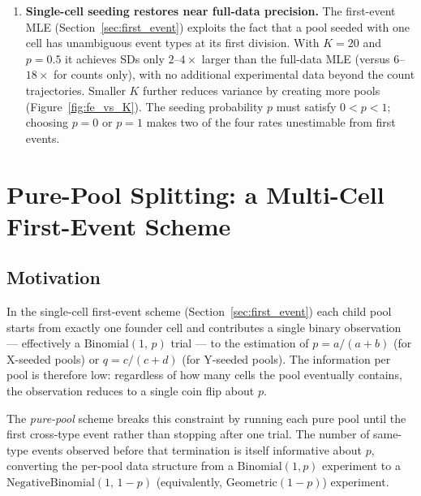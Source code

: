 \documentclass[12pt]{article}
\begin{document}
\begin{enumerate}
  \item \textbf{Single-cell seeding restores near full-data precision.}
        The first-event MLE (Section~\ref{sec:first_event}) exploits the
        fact that a pool seeded with one cell has unambiguous event types
        at its first division.  With $K = 20$ and $p = 0.5$ it achieves
        SDs only $2$--$4\times$ larger than the full-data MLE (versus
        $6$--$18\times$ for counts only), with no additional experimental
        data beyond the count trajectories.  Smaller $K$ further reduces
        variance by creating more pools (Figure~\ref{fig:fe_vs_K}).
        The seeding probability $p$ must satisfy $0 < p < 1$; choosing
        $p = 0$ or $p = 1$ makes two of the four rates unestimable from
        first events.
\end{enumerate}


\section{Pure-Pool Splitting: a Multi-Cell First-Event Scheme}
\label{sec:pure_pool}

\subsection{Motivation}

In the single-cell first-event scheme (Section~\ref{sec:first_event}) each
child pool starts from exactly one founder cell and contributes a single binary
observation — effectively a $\mathrm{Binomial}(1,\,p)$ trial — to the
estimation of $p = a/(a+b)$ (for X-seeded pools) or $q = c/(c+d)$ (for
Y-seeded pools).  The information per pool is therefore low: regardless of how
many cells the pool eventually contains, the observation reduces to a single
coin flip about $p$.

The \emph{pure-pool} scheme breaks this constraint by running each pure pool
until the first cross-type event rather than stopping after one trial.  The
number of same-type events observed before that termination is itself
informative about $p$, converting the per-pool data structure from a
$\mathrm{Binomial}(1,p)$ experiment to a
$\mathrm{NegativeBinomial}(1,\,1-p)$ (equivalently,
$\mathrm{Geometric}(1-p)$) experiment.
\end{document}

